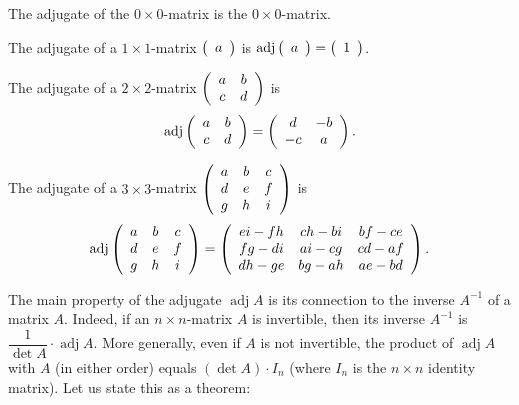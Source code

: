 \begin{example}
The adjugate of the $0\times0$-matrix is the $0\times0$-matrix.

The adjugate of a $1\times1$-matrix $\left(
\begin{array}
[c]{c}%
a
\end{array}
\right)  $ is $\operatorname*{adj}\left(
\begin{array}
[c]{c}%
a
\end{array}
\right)  =\left(
\begin{array}
[c]{c}%
1
\end{array}
\right)  $.

The adjugate of a $2\times2$-matrix $\left(
\begin{array}
[c]{cc}%
a & b\\
c & d
\end{array}
\right)  $ is
\[
\operatorname*{adj}\left(
\begin{array}
[c]{cc}%
a & b\\
c & d
\end{array}
\right)  =\left(
\begin{array}
[c]{cc}%
d & -b\\
-c & a
\end{array}
\right)  .
\]


The adjugate of a $3\times3$-matrix $\left(
\begin{array}
[c]{ccc}%
a & b & c\\
d & e & f\\
g & h & i
\end{array}
\right)  $ is
\[
\operatorname*{adj}\left(
\begin{array}
[c]{ccc}%
a & b & c\\
d & e & f\\
g & h & i
\end{array}
\right)  =\left(
\begin{array}
[c]{ccc}%
ei-fh & ch-bi & bf-ce\\
fg-di & ai-cg & cd-af\\
dh-ge & bg-ah & ae-bd
\end{array}
\right)  .
\]

\end{example}

The main property of the adjugate $\operatorname*{adj}A$ is its connection to
the inverse $A^{-1}$ of a matrix $A$. Indeed, if an $n\times n$-matrix $A$ is
invertible, then its inverse $A^{-1}$ is $\dfrac{1}{\det A}\cdot
\operatorname*{adj}A$. More generally, even if $A$ is not invertible, the
product of $\operatorname*{adj}A$ with $A$ (in either order) equals $\left(
\det A\right)  \cdot I_{n}$ (where $I_{n}$ is the $n\times n$ identity
matrix). Let us state this as a theorem:


